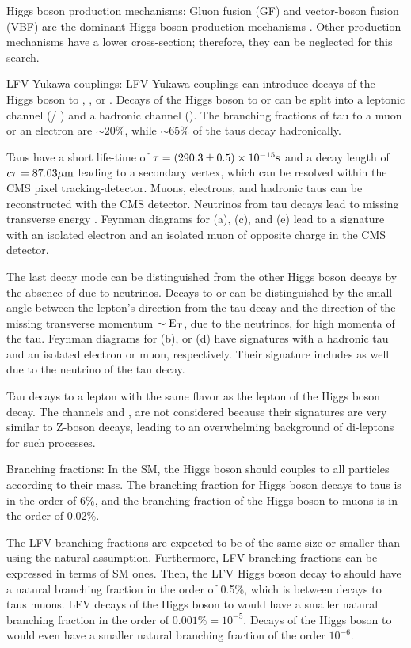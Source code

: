 Higgs boson production mechanisms: Gluon fusion (GF) and vector-boson fusion (VBF) are the dominant Higgs boson production-mechanisms \cite{deFlorian:2016spz}. Other production mechanisms have a lower cross-section; therefore, they can be neglected for this search.

LFV Yukawa couplings: LFV Yukawa couplings can introduce decays of the Higgs boson to \mutau, \etau, or \emm. Decays of the Higgs boson to \mutau or \etau can be split into a leptonic channel (\taue / \taum) and a hadronic channel (\tauh). The branching fractions of tau to a muon or an electron are $\sim 20 \%$, while $\sim 65 \%$ of the taus decay hadronically.

Taus have a short life-time of $\tau=(290.3 \pm 0.5) \times 10^{-15} \mathrm{s}$ and a decay length of $c \tau=87.03 \mu \mathrm{m}$ leading to a secondary vertex, which can be resolved within the CMS pixel tracking-detector. Muons, electrons, and hadronic taus can be reconstructed with the CMS detector. Neutrinos from tau decays lead to missing transverse energy \met. Feynman diagrams for \Hmue (a), \Hemu (c), and \Hem (e) lead to a signature with an isolated electron and an isolated muon of opposite charge in the CMS detector.

The last decay mode can be distinguished from the other Higgs boson decays by the absence of \ET due to neutrinos. Decays to \mue or \emu can be distinguished by the small angle between the lepton's direction from the tau decay and the direction of the missing transverse momentum $\sim \text{E}_\text{T}$, due to the neutrinos, for high momenta of the tau. Feynman diagrams for \Hmuhad (b), or \Hehad (d) have signatures with a hadronic tau and an isolated electron or muon, respectively. Their signature includes \ET as well due to the neutrino of the tau decay.

Tau decays to a lepton with the same flavor as the lepton of the Higgs boson decay. The channels \ee and \mm, are not considered because their signatures are very similar to Z-boson decays, leading to an overwhelming background of di-leptons for such processes.

Branching fractions: In the SM, the Higgs boson should couples to all particles according to their mass. The branching fraction for Higgs boson decays to taus is in the order of 6\%, and the branching fraction of the Higgs boson to muons is in the order of 0.02\%.

The LFV branching fractions are expected to be of the same size or smaller than \BHij using the natural assumption. Furthermore, LFV branching fractions \BHij can be expressed in terms of SM ones. Then, the LFV Higgs boson decay to \mutau should have a natural branching fraction in the order of 0.5\%, which is between decays to taus muons. LFV decays of the Higgs boson to \etau would have a smaller natural branching fraction in the order of $0.001\% = 10^{-5}$. Decays of the Higgs boson to \emm would even have a smaller natural branching fraction of the order $10^{-6}$.


